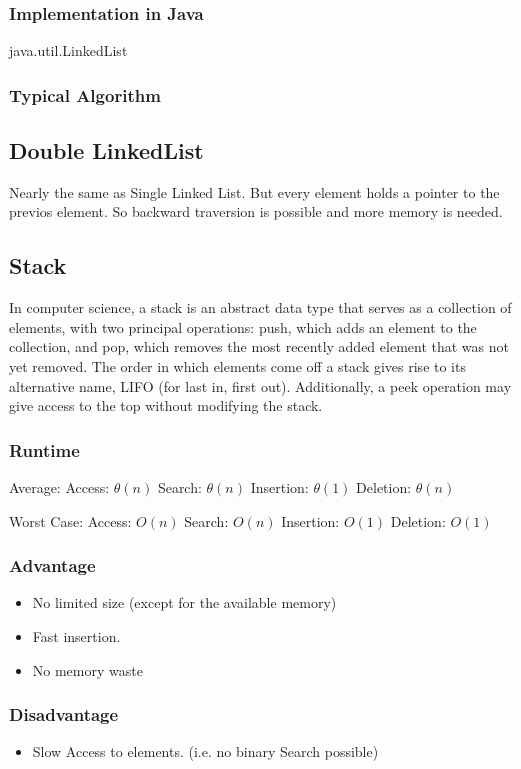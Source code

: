 \documentclass[12pt,a4paper]{article}
\newcommand{\RuntimeHead}{Runtime}
\newcommand{\AdvantageHead}{Advantage}
\newcommand{\DisadvantageHead}{Disadvantage}
\newcommand{\ImplementationInJavaHead}{Implementation in Java}
\newcommand{\TypicalAlgorithmHead}{Typical Algorithm}
\begin{document}
\subsubsection{\ImplementationInJavaHead}
java.util.LinkedList
\subsubsection{\TypicalAlgorithmHead}

\subsection{Double LinkedList}
Nearly the same as Single Linked List. But every element holds a pointer to the previos element. So backward traversion is possible and more memory is needed.

\subsection{Stack}
In computer science, a stack is an abstract data type that serves as a collection of elements, with two principal operations: push, which adds an element to the collection, and pop, which removes the most recently added element that was not yet removed. The order in which elements come off a stack gives rise to its alternative name, LIFO (for last in, first out). Additionally, a peek operation may give access to the top without modifying the stack.
\subsubsection{\RuntimeHead}
Average: 
Access: $\theta(n)  $
Search: $\theta(n) $
Insertion: $ \theta(1)$ 
Deletion: $\theta (n)$ 

Worst Case: 
Access: $O(n)$  
Search: $O(n) $
Insertion: $O(1)$ 
Deletion: $O(1)$ 

\subsubsection{\AdvantageHead}
\begin{itemize}
\item No limited size (except for the available memory)
\item Fast insertion. 
\item No memory waste
\end{itemize}
\subsubsection{\DisadvantageHead}
\begin{itemize}
\item Slow Access to elements. (i.e. no binary Search possible)
\end{itemize}
\end{document}
